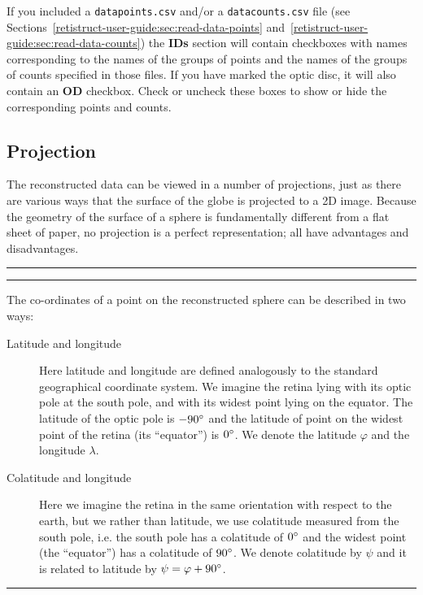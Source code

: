 \documentclass{book}
\newenvironment{aside}[1]%
{\noindent\begin{minipage}{\textwidth}\vspace*{1em}\hrule height2pt\vspace*{2pt}
  \noindent{\bf Note: #1}\par%
  \vspace*{2pt}%
  \hrule height1pt
  \vspace*{2pt}\noindent\ignorespaces}%
  {\vspace*{2pt}\hrule height1pt\vspace*{1em}\end{minipage}}
\begin{document}
If you included a \texttt{datapoints.csv} and/or a
\texttt{datacounts.csv} file (see
Sections~\ref{retistruct-user-guide:sec:read-data-points}
and~\ref{retistruct-user-guide:sec:read-data-counts})
the \textbf{IDs} section will contain checkboxes with names
corresponding to the names of the groups of points and the names of
the groups of counts specified in those files. If you have marked the
optic disc, it will also contain an \textbf{OD} checkbox. Check or
uncheck these boxes to show or hide the corresponding points and
counts.

\subsection{Projection}
\label{retistruct-user-guide:sec:projection}

The reconstructed data can be viewed in a number of projections, just
as there are various ways that the surface of the globe is projected
to a 2D image. Because the geometry of the surface of a sphere is
fundamentally different from a flat sheet of paper, no projection is a
perfect representation; all have advantages and disadvantages.

\begin{aside}{Coordinate systems}
  The co-ordinates of a point on the reconstructed sphere can be
  described in two ways:
  \begin{description}
  \item[Latitude and longitude] Here latitude and longitude are
    defined analogously to the standard geographical coordinate
    system. We imagine the retina lying with its optic pole at the
    south pole, and with its widest point lying on the equator. The
    latitude of the optic pole is $-90\degree$ and the latitude of
    point on the widest point of the retina (its ``equator'') is
    $0\degree$. We denote the latitude $\varphi$ and the longitude
    $\lambda$.
  \item [Colatitude and longitude] Here we imagine the retina in the
    same orientation with respect to the earth, but we rather than
    latitude, we use colatitude measured from the south pole, i.e. the
    south pole has a colatitude of $0\degree$ and the widest point
    (the ``equator'') has a colatitude of $90\degree$. We denote
    colatitude by $\psi$ and it is related to latitude by
    $\psi=\varphi+90\degree$.
  \end{description}

\end{aside}
\end{document}
